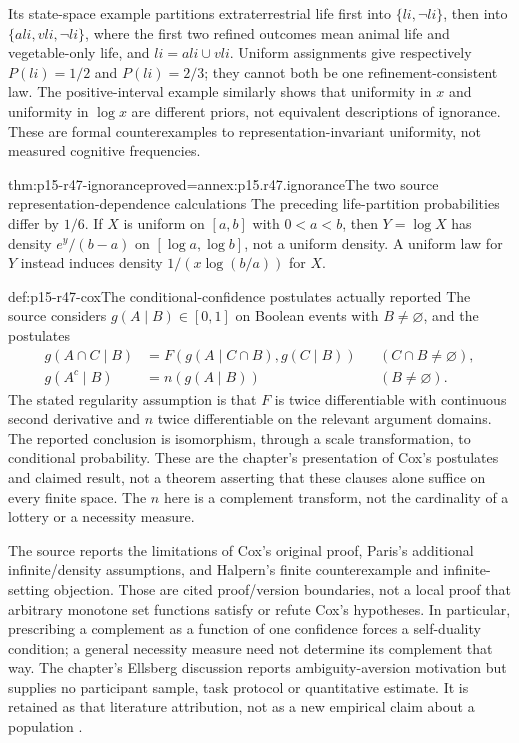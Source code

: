 Its state-space example partitions extraterrestrial life first into
\(\{li,\neg li\}\), then into
\(\{ali,vli,\neg li\}\), where the first two refined outcomes mean animal
life and vegetable-only life, and \(li=ali\cup vli\). Uniform assignments
give respectively \(P(li)=1/2\) and \(P(li)=2/3\); they cannot both be one
refinement-consistent law. The positive-interval example similarly shows
that uniformity in \(x\) and uniformity in \(\log x\) are different priors,
not equivalent descriptions of ignorance. These are formal counterexamples
to representation-invariant uniformity, not measured cognitive frequencies.

\begin{hblemma}{thm:p15-r47-ignorance}{proved=annex:p15.r47.ignorance}{The two source representation-dependence calculations}
The preceding life-partition probabilities differ by \(1/6\).
If \(X\) is uniform on \([a,b]\) with \(0<a<b\), then
\(Y=\log X\) has density \(e^y/(b-a)\) on
\([\log a,\log b]\), not a uniform density. A uniform law for \(Y\)
instead induces density \(1/(x\log(b/a))\) for \(X\).
\end{hblemma}

\begin{hbdefinition}{def:p15-r47-cox}{The conditional-confidence postulates actually reported}
The source considers \(g(A\mid B)\in[0,1]\) on Boolean events with
\(B\ne\varnothing\), and the postulates
\[
\begin{aligned}
 g(A\cap C\mid B)&=F(g(A\mid C\cap B),g(C\mid B))
                      &&(C\cap B\ne\varnothing),\\
 g(A^c\mid B)&=n(g(A\mid B)) &&(B\ne\varnothing).
\end{aligned}
\]
The stated regularity assumption is that \(F\) is twice differentiable
with continuous second derivative and \(n\) twice differentiable on the
relevant argument domains. The reported conclusion is isomorphism, through
a scale transformation, to conditional probability. These are the
chapter's presentation of Cox's postulates and claimed result, not a
theorem asserting that these clauses alone suffice on every finite space.
The \(n\) here is a complement transform, not the cardinality of a lottery
or a necessity measure.
\end{hbdefinition}

The source reports the limitations of Cox's original proof, Paris's
additional infinite/density assumptions, and Halpern's finite counterexample
and infinite-setting objection. Those are cited proof/version boundaries,
not a local proof that arbitrary monotone set functions satisfy or refute
Cox's hypotheses. In particular, prescribing a complement as a function
of one confidence forces a self-duality condition; a general necessity
measure need not determine its complement that way. The chapter's Ellsberg
discussion reports ambiguity-aversion motivation but supplies no participant
sample, task protocol or quantitative estimate. It is retained as that
literature attribution, not as a new empirical claim about a population
\cite[\S4.1]{DuboisPrade2021RepresentingBelief}.

